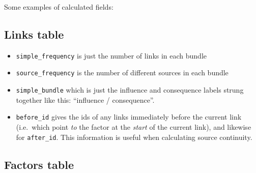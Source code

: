 \documentclass[
]{book}
\providecommand{\tightlist}{%
  \setlength{\itemsep}{0pt}\setlength{\parskip}{0pt}}
\begin{document}
Some examples of calculated fields:

\hypertarget{links-table}{%
\subsection{Links table}\label{links-table}}

\begin{itemize}
\tightlist
\item
  \texttt{simple\_frequency} is just the number of links in each bundle
\item
  \texttt{source\_frequency} is the number of different sources in each bundle
\item
  \texttt{simple\_bundle} which is just the influence and consequence labels strung together like this: ``influence / consequence''.
\item
  \texttt{before\_id} gives the ids of any links immediately before the current link (i.e.~which point \emph{to} the factor at the \emph{start} of the current link), and likewise for \texttt{after\_id}. This information is useful when calculating source continuity.
\end{itemize}

\hypertarget{factors-table}{%
\subsection{Factors table}\label{factors-table}}
\end{document}

